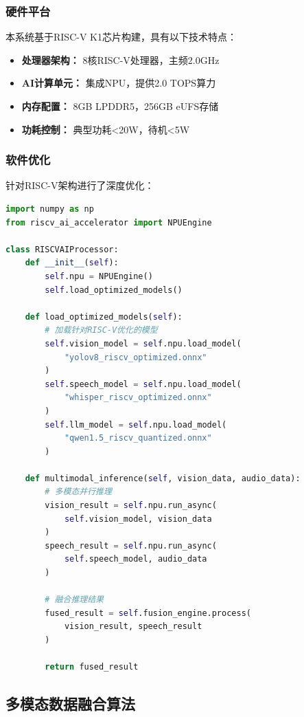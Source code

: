 \documentclass[12pt,a4paper]{article}
\begin{document}
\subsubsection{硬件平台}

本系统基于RISC-V K1芯片构建，具有以下技术特点：

\begin{itemize}[leftmargin=2em]
    \item \textbf{处理器架构：} 8核RISC-V处理器，主频2.0GHz
    \item \textbf{AI计算单元：} 集成NPU，提供2.0 TOPS算力
    \item \textbf{内存配置：} 8GB LPDDR5，256GB eUFS存储
    \item \textbf{功耗控制：} 典型功耗<20W，待机<5W
\end{itemize}

\subsubsection{软件优化}

针对RISC-V架构进行了深度优化：

\begin{lstlisting}[language=Python, caption=RISC-V优化的AI推理代码示例]
import numpy as np
from riscv_ai_accelerator import NPUEngine

class RISCVAIProcessor:
    def __init__(self):
        self.npu = NPUEngine()
        self.load_optimized_models()
    
    def load_optimized_models(self):
        # 加载针对RISC-V优化的模型
        self.vision_model = self.npu.load_model(
            "yolov8_riscv_optimized.onnx"
        )
        self.speech_model = self.npu.load_model(
            "whisper_riscv_optimized.onnx"
        )
        self.llm_model = self.npu.load_model(
            "qwen1.5_riscv_quantized.onnx"
        )
    
    def multimodal_inference(self, vision_data, audio_data):
        # 多模态并行推理
        vision_result = self.npu.run_async(
            self.vision_model, vision_data
        )
        speech_result = self.npu.run_async(
            self.speech_model, audio_data
        )
        
        # 融合推理结果
        fused_result = self.fusion_engine.process(
            vision_result, speech_result
        )
        
        return fused_result
\end{lstlisting}

\subsection{多模态数据融合算法}
\end{document}
